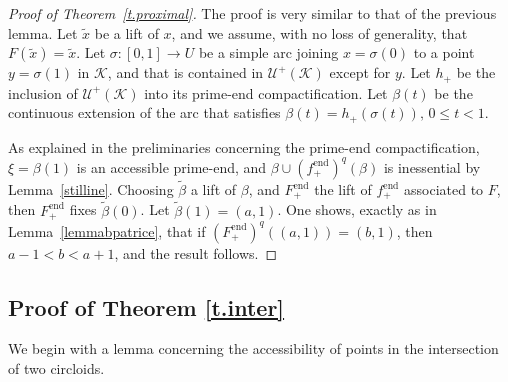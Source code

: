\documentclass[12pt,a4paper]{amsart}
\theoremstyle{definition}
\theoremstyle{remark}
\begin{document}
\begin{proof}[Proof of Theorem~\ref{t.proximal}]
The proof is very similar to that of the previous lemma. Let $\widetilde x$ be a lift of $x$, and we assume, with no loss of generality, that $F(\widetilde x)=\widetilde x$. Let $\sigma:[0,1]\to U$ be a simple arc joining $x=\sigma(0)$ to a point $y=\sigma(1)$ in $\mathcal{K}$, and that is contained in $\mathcal{U}^{+}(\mathcal{K})$ except for $y$. Let $h_{+}$ be the inclusion of $\mathcal{U}^+(\mathcal{K})$ into its prime-end compactification. Let $\beta(t)$ be the continuous extension of the arc that satisfies $\beta(t)=h_+(\sigma(t)),\,0\le t<1$. 

As explained in the preliminaries concerning the prime-end compactification, $\xi=\beta(1)$ is an accessible prime-end, and $\beta\cup (f^{\mathrm{end}}_+)^q(\beta)$ is inessential by Lemma~\ref{stilline}. Choosing $\widetilde \beta$ a lift of $\beta$, and $F^{\mathrm{end}}_{+}$ the lift of $f^{\mathrm{end}}_{+}$ associated to $F$, then $F^{\mathrm{end}}_{+}$ fixes $\widetilde \beta(0)$. Let $\widetilde \beta(1)=(a,1)$. One shows, exactly as in Lemma~\ref{lemmabpatrice}, that if $(F^{\mathrm{end}}_{+})^q((a,1))=(b,1)$, then $a-1<b<a+1$, and the result follows.
\end{proof}


\subsection{Proof of Theorem \ref{t.inter}}\label{sub.3.2}

We begin with a lemma concerning the accessibility of points in the intersection of two circloids.
\end{document}
